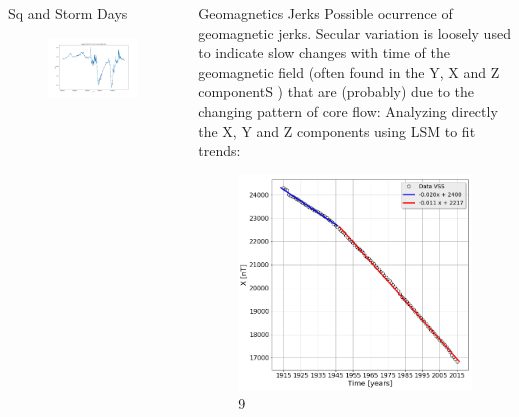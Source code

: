 \documentclass[final,t]{beamer}
\begin{document}
\begin{columns}[t]
\begin{column}{.66\linewidth}
\begin{columns}
\begin{column}{.31\linewidth}
\begin{block}{Sq and Storm Days}
	\justifying
\begin{figure}
\centering
\includegraphics[width=0.8\linewidth]{F27_31_october(2003)}
\label{fig:F27_31_october(2003)}
\end{figure}
	
	
\end{block}	
	

\end{column}


\begin{column}{.31\linewidth}
	
	
	\begin{block}{Geomagnetics Jerks}
		\justifying
		Possible ocurrence of geomagnetic jerks.
		Secular variation is loosely used to indicate slow changes with time of the geomagnetic field
		(often found in the Y, X and Z componentS ) that are (probably) due to the changing pattern of core
		flow:
		Analyzing directly the X, Y and Z components using LSM to fit trends: 	
		
		\begin{figure}
\centering
\includegraphics[scale=0.8]{"figs_ed/Linear regression X_v3"}
\caption{9}
\label{fig:LinearregressionX_v2}
\end{figure}
	

\end{block}
\end{column}
\end{columns}
\end{column}
\end{columns}
\end{document}
